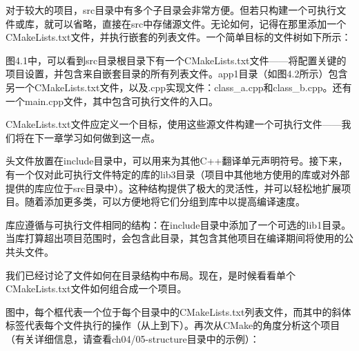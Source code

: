 对于较大的项目，src目录中有多个子目录会非常方便。但若只构建一个可执行文件或库，就可以省略，直接在src中存储源文件。无论如何，记得在那里添加一个CMakeLists.txt文件，并执行嵌套的列表文件。一个简单目标的文件树如下所示：


图4.1中，可以看到src目录根目录下有一个CMakeLists.txt文件——将配置关键的项目设置，并包含来自嵌套目录的所有列表文件。app1目录（如图4.2所示）包含另一个CMakeLists.txt文件，以及.cpp实现文件：class\_a.cpp和class\_b.cpp。还有一个main.cpp文件，其中包含可执行文件的入口。

CMakeLists.txt文件应定义一个目标，使用这些源文件构建一个可执行文件——我们将在下一章学习如何做到这一点。

头文件放置在include目录中，可以用来为其他C++翻译单元声明符号。接下来，有一个仅对此可执行文件特定的库的lib3目录（项目中其他地方使用的库或对外部提供的库应位于src目录中）。这种结构提供了极大的灵活性，并可以轻松地扩展项目。随着添加更多类，可以方便地将它们分组到库中以提高编译速度。


库应遵循与可执行文件相同的结构：在include目录中添加了一个可选的lib1目录。当库打算超出项目范围时，会包含此目录，其包含其他项目在编译期间将使用的公共头文件。

我们已经讨论了文件如何在目录结构中布局。现在，是时候看看单个CMakeLists.txt文件如何组合成一个项目。


图中，每个框代表一个位于每个目录中的CMakeLists.txt列表文件，而其中的斜体标签代表每个文件执行的操作（从上到下）。再次从CMake的角度分析这个项目（有关详细信息，请查看ch04/05-structure目录中的示例）：

